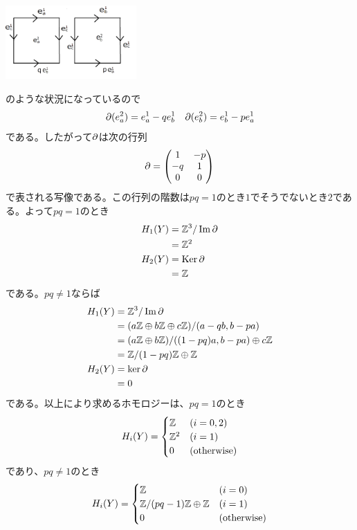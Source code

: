 \begin{sol}
\begin{center}
\includegraphics[width=5cm]{H31expert05_02.png}
\end{center}

のような状況になっているので
\[
\partial(e_a^2) = e_a^1 - qe_b^1 \quad \partial(e_b^2) = e_b^1 - pe_a^1
\]
である。したがって$\partial$は次の行列
\[
\partial = \begin{pmatrix} 
1 & -p \\
-q & 1 \\
0 & 0
 \end{pmatrix}
\]
で表される写像である。この行列の階数は$pq =1$のとき$1$でそうでないとき$2$である。よって$pq = 1$のとき
\begin{align*}
  H_1(Y) &= {\mathbb Z}^3 / \operatorname{Im} \partial \\
  &= {\mathbb Z}^2 \\
  H_2(Y) &= \operatorname{Ker} \partial \\
  &= {\mathbb Z}
\end{align*}
である。$pq \neq 1$ならば
\begin{align*}
  H_1(Y) &= {\mathbb Z}^3 / \operatorname{Im} \partial \\
  &= (a {\mathbb Z} \oplus  b {\mathbb Z} \oplus c {\mathbb Z})  / (a - qb, b - pa) \\
  &= (a {\mathbb Z} \oplus  b {\mathbb Z} )  / ( (1-pq)a, b - pa) \oplus c {\mathbb Z} \\
  &= {\mathbb Z} / (1-pq){\mathbb Z} \oplus {\mathbb Z} \\
  H_2(Y) &= \ker \partial \\
  &= 0
\end{align*}
である。以上により求めるホモロジーは、$pq = 1$のとき
\[
H_i(Y) = \begin{cases}
{\mathbb Z} &(i=0,2) \\
{\mathbb Z}^2 &(i=1) \\
0 &(\text{otherwise})
\end{cases}
\]
であり、$pq \neq 1$のとき
\[
H_i(Y) = \begin{cases}
{\mathbb Z} &(i=0) \\
{\mathbb Z} / (pq-1){\mathbb Z} \oplus {\mathbb Z} &(i=1) \\
0 &(\text{otherwise})
\end{cases}
\]
\end{sol}
